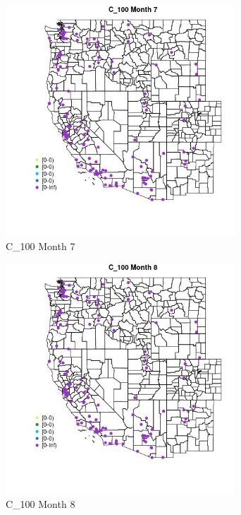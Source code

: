 \begin{figure} 
\centering  
\includegraphics[width=0.77\textwidth]{Code_Outputs/Report_ML_input_PM25_Step4_part_e_de_duplicated_aves_MapObsMo7C_100.jpg} 
\caption{\label{fig:Report_ML_input_PM25_Step4_part_e_de_duplicated_avesMapObsMo7C_100}C_100 Month 7} 
\end{figure} 
 

\begin{figure} 
\centering  
\includegraphics[width=0.77\textwidth]{Code_Outputs/Report_ML_input_PM25_Step4_part_e_de_duplicated_aves_MapObsMo8C_100.jpg} 
\caption{\label{fig:Report_ML_input_PM25_Step4_part_e_de_duplicated_avesMapObsMo8C_100}C_100 Month 8} 
\end{figure} 
 

